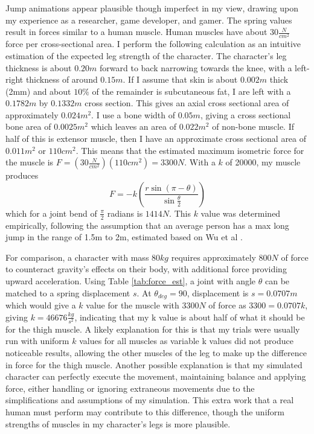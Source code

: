 Jump animations appear plausible though imperfect in my view, drawing upon my experience as a researcher, game developer, and gamer.  The spring values result in forces similar to a human muscle.  Human muscles have about $30\frac{N}{cm^2}$ force per cross-sectional area\cite{biomech_sport}. I perform the following calculation as an intuitive estimation of the expected leg strength of the character. The character's leg thickness is about $0.20m$ forward to back narrowing towards the knee, with a left-right thickness of around $0.15m$. If I assume that skin is about $0.002m$ thick (2mm) and about $10\%$ of the remainder is subcutaneous fat, I are left with a $0.1782m$ by $0.1332m$ cross section.  This gives an axial cross sectional area of approximately $0.024m^2$.  I use a bone width of $0.05m$, giving a cross sectional bone area of $0.0025m^2$ which leaves an area of $0.022m^2$ of non-bone muscle.  If half of this is extensor muscle, then I have an approximate cross sectional area of $0.011m^2$ or $110cm^2$.  This means that the estimated maximum isometric force for the muscle is $F = \left(30 \frac{N}{cm^2}\right) \left(110cm^2\right) = 3300N$.  With a $k$ of 20000, my muscle produces \[
	F = -k \left(\dfrac{r \sin (\pi - \theta)}{\sin \frac{\theta}{2}} \right)
\]
which for a joint bend of $\frac{\pi}{2}$ radians is $1414N$.  This $k$ value was determined empirically, following the assumption that an average person has a max long jump in the range of 1.5m to 2m, estimated based on Wu et al \cite{longjump}.    

For comparison, a character with mass $80kg$ requires approximately $800N$ of force to counteract gravity's effects on their body, with additional force providing upward acceleration.  Using Table \ref{tab:force_est}, a joint with angle $\theta$ can be matched to a spring displacement $s$.  At $\theta_{deg} = 90$, displacement is $s=0.0707m$ which would give a $k$ value for the muscle with $3300N$ of force as $3300 = 0.0707k$, giving $k = 46676\frac{kg}{s^2}$, indicating that my k value is about half of what it should be for the thigh muscle.  A likely explanation for this is that my trials were usually run with uniform $k$ values for all muscles as variable k values did not produce noticeable results, allowing the other muscles of the leg to make up the difference in force for the thigh muscle.  Another possible explanation is that my simulated character can perfectly execute the movement, maintaining balance and applying force, either handling or ignoring extraneous movements due to the simplifications and assumptions of my simulation.  This extra work that a real human must perform may contribute to this difference, though the uniform strengths of muscles in my character's legs is more plausible.

